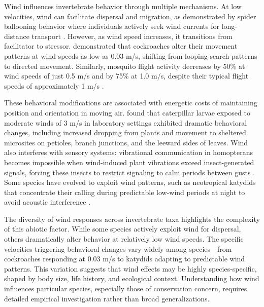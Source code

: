 
Wind influences invertebrate behavior through multiple mechanisms. At low velocities, wind can facilitate dispersal and migration, as demonstrated by spider ballooning behavior where individuals actively seek wind currents for long-distance transport \citep{bonteHeritabilitySpiderBallooning2007}. However, as wind speed increases, it transitions from facilitator to stressor. \citet{bellSearchAnemotacticOrientation1979} demonstrated that cockroaches alter their movement patterns at wind speeds as low as 0.03 m/s, shifting from looping search patterns to directed movement. Similarly, mosquito flight activity decreases by 50\% at wind speeds of just 0.5 m/s and by 75\% at 1.0 m/s, despite their typical flight speeds of approximately 1 m/s \citep{bidlingmayerEffectWindVelocity1995}.

These behavioral modifications are associated with energetic costs of maintaining position and orientation in moving air. \citet{leonardExposureWindAlters2016} found that caterpillar larvae exposed to moderate winds of 3 m/s in laboratory settings exhibited dramatic behavioral changes, including increased dropping from plants and movement to sheltered microsites on petioles, branch junctions, and the leeward sides of leaves. Wind also interferes with sensory systems: vibrational communication in homopterans becomes impossible when wind-induced plant vibrations exceed insect-generated signals, forcing these insects to restrict signaling to calm periods between gusts \citep{tishechkinVibrationalBackgroundNoise2013}. Some species have evolved to exploit wind patterns, such as neotropical katydids that concentrate their calling during predictable low-wind periods at night to avoid acoustic interference \citep{velillaGoneWindSignal2020}.

The diversity of wind responses across invertebrate taxa highlights the complexity of this abiotic factor. While some species actively exploit wind for dispersal, others dramatically alter behavior at relatively low wind speeds. The specific velocities triggering behavioral changes vary widely among species—from cockroaches responding at 0.03 m/s to katydids adapting to predictable wind patterns. This variation suggests that wind effects may be highly species-specific, shaped by body size, life history, and ecological context. Understanding how wind influences particular species, especially those of conservation concern, requires detailed empirical investigation rather than broad generalizations.

